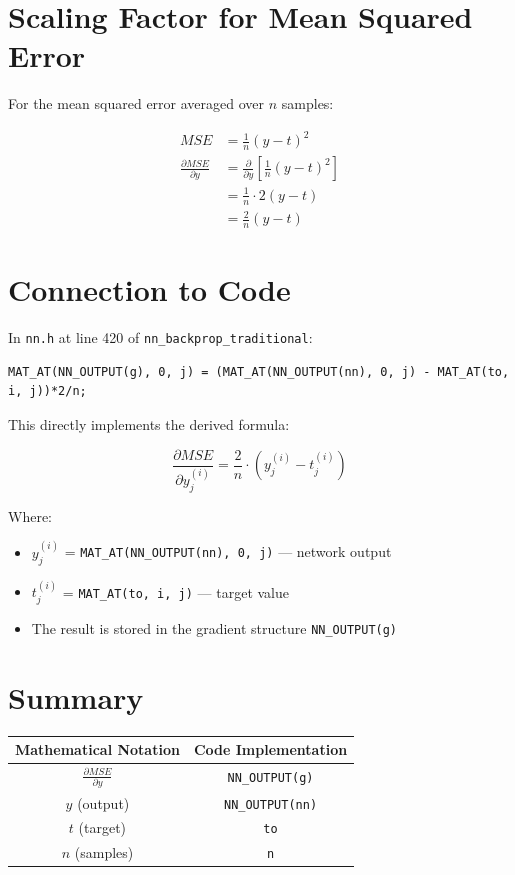 \documentclass[12pt,a4paper]{article}
\begin{document}
\section{Scaling Factor for Mean Squared Error}

For the mean squared error averaged over $n$ samples:

\begin{align}
MSE &= \frac{1}{n} (y - t)^2 \\
\frac{\partial MSE}{\partial y} &= \frac{\partial}{\partial y} \left[ \frac{1}{n} (y - t)^2 \right] \\
&= \frac{1}{n} \cdot 2(y - t) \\
&= \frac{2}{n}(y - t)
\end{align}

\section{Connection to Code}

In \texttt{nn.h} at line 420 of \texttt{nn\_backprop\_traditional}:

\begin{verbatim}
MAT_AT(NN_OUTPUT(g), 0, j) = (MAT_AT(NN_OUTPUT(nn), 0, j) - MAT_AT(to, i, j))*2/n;
\end{verbatim}

This directly implements the derived formula:

\begin{equation}
\frac{\partial MSE}{\partial y_j^{(i)}} = \frac{2}{n} \cdot (y_j^{(i)} - t_j^{(i)})
\end{equation}

Where:
\begin{itemize}
    \item $y_j^{(i)}$ = \texttt{MAT\_AT(NN\_OUTPUT(nn), 0, j)} — network output
    \item $t_j^{(i)}$ = \texttt{MAT\_AT(to, i, j)} — target value
    \item The result is stored in the gradient structure \texttt{NN\_OUTPUT(g)}
\end{itemize}

\section{Summary}

\begin{center}
\begin{tabular}{|c|c|}
\hline
\textbf{Mathematical Notation} & \textbf{Code Implementation} \\
\hline
$\frac{\partial MSE}{\partial y}$ & \texttt{NN\_OUTPUT(g)} \\
\hline
$y$ (output) & \texttt{NN\_OUTPUT(nn)} \\
\hline
$t$ (target) & \texttt{to} \\
\hline
$n$ (samples) & \texttt{n} \\
\hline
\end{tabular}
\end{center}
\end{document}

